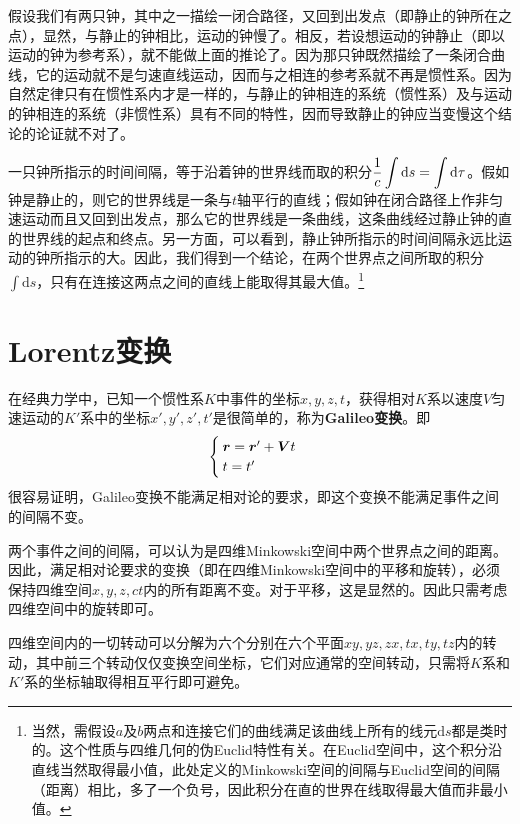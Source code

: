 假设我们有两只钟，其中之一描绘一闭合路径，又回到出发点（即静止的钟所在之点），显然，与静止的钟相比，运动的钟慢了。相反，若设想运动的钟静止（即以运动的钟为参考系），就不能做上面的推论了。因为那只钟既然描绘了一条闭合曲线，它的运动就不是匀速直线运动，因而与之相连的参考系就不再是惯性系。因为自然定律只有在惯性系内才是一样的，与静止的钟相连的系统（惯性系）及与运动的钟相连的系统（非惯性系）具有不同的特性，因而导致静止的钟应当变慢这个结论的论证就不对了。

一只钟所指示的时间间隔，等于沿着钟的世界线而取的积分$\displaystyle \dfrac{1}{c}\int\mathrm{d}s = \int \mathrm{d} \tau$。假如钟是静止的，则它的世界线是一条与$t$轴平行的直线；假如钟在闭合路径上作非匀速运动而且又回到出发点，那么它的世界线是一条曲线，这条曲线经过静止钟的直的世界线的起点和终点。另一方面，可以看到，静止钟所指示的时间间隔永远比运动的钟所指示的大。因此，我们得到一个结论，在两个世界点之间所取的积分$\displaystyle \int\mathrm{d}s$，只有在连接这两点之间的直线上能取得其最大值。\footnote{当然，需假设$a$及$b$两点和连接它们的曲线满足该曲线上所有的线元$\mathrm{d}s$都是类时的。这个性质与四维几何的伪Euclid特性有关。在Euclid空间中，这个积分沿直线当然取得最小值，此处定义的Minkowski空间的间隔与Euclid空间的间隔（距离）相比，多了一个负号，因此积分在直的世界在线取得最大值而非最小值。}

\section{Lorentz变换}

在经典力学中，已知一个惯性系$K$中事件的坐标$x,y,z,t$，获得相对$K$系以速度$V$匀速运动的$K'$系中的坐标$x',y',z',t'$是很简单的，称为{\bf Galileo变换}。即
\begin{equation}
\begin{cases}
	\boldsymbol{r} = \boldsymbol{r}'+\boldsymbol{V}t \\
	t = t'
\end{cases}
\end{equation}
很容易证明，Galileo变换不能满足相对论的要求，即这个变换不能满足事件之间的间隔不变。

两个事件之间的间隔，可以认为是四维Minkowski空间中两个世界点之间的距离。因此，满足相对论要求的变换（即在四维Minkowski空间中的平移和旋转），必须保持四维空间$x,y,z,ct$内的所有距离不变。对于平移，这是显然的。因此只需考虑四维空间中的旋转即可。

四维空间内的一切转动可以分解为六个分别在六个平面$xy,yz,zx,tx,ty,tz$内的转动，其中前三个转动仅仅变换空间坐标，它们对应通常的空间转动，只需将$K$系和$K'$系的坐标轴取得相互平行即可避免。

